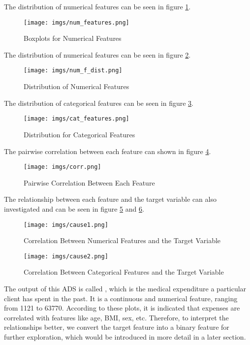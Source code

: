 \documentclass[10pt]{article}
\newcommand{\code}[1]{{\color{black}{\texttt{#1}}}} %
\begin{document}
The distribution of numerical features can be seen in figure \ref{fig:num_f}.
\begin{figure}[h!]
    \centering
    \texttt{[image: imgs/num\_features.png]}
    \caption{Boxplots for Numerical Features}
    \label{fig:num_f}
\end{figure}
The distribution of numerical features can be seen in figure \ref{fig:dist_f}.
\begin{figure}[h!]
    \centering
    \texttt{[image: imgs/num\_f\_dist.png]}
    \caption{Distribution of Numerical Features}
    \label{fig:dist_f}
\end{figure}
The distribution of categorical features can be seen in figure \ref{fig:cat_f}.
\begin{figure}[h!]
    \centering
    \texttt{[image: imgs/cat\_features.png]}
    \caption{Distribution for Categorical Features}
    \label{fig:cat_f}
\end{figure}
The pairwise correlation between each feature can shown in figure \ref{fig:corr}.
\begin{figure}[h!]
    \centering
    \texttt{[image: imgs/corr.png]}
    \caption{Pairwise Correlation Between Each Feature}
    \label{fig:corr}
\end{figure}

The relationship between each feature and the target variable can also investigated and can be seen in figure \ref{fig:cause1} and \ref{fig:cause2}.
\begin{figure}[h!]
    \centering
    \texttt{[image: imgs/cause1.png]}
    \caption{Correlation Between Numerical Features and the Target Variable}
    \label{fig:cause1}
\end{figure}
\begin{figure}[h!]
    \centering
    \texttt{[image: imgs/cause2.png]}
    \caption{Correlation Between Categorical Features and the Target Variable}
    \label{fig:cause2}
\end{figure}

The output of this ADS is called \code{expenses}, which is the medical expenditure a particular client has spent in the past. It is a continuous and numerical feature, ranging from 1121 to 63770. According to these plots, it is indicated that expenses are correlated with features like age, BMI, sex, etc. Therefore, to interpret the relationships better, we convert the target feature \code{expenses} into a binary feature for further exploration, which would be introduced in more detail in a later section. 
\FloatBarrier
\end{document}
